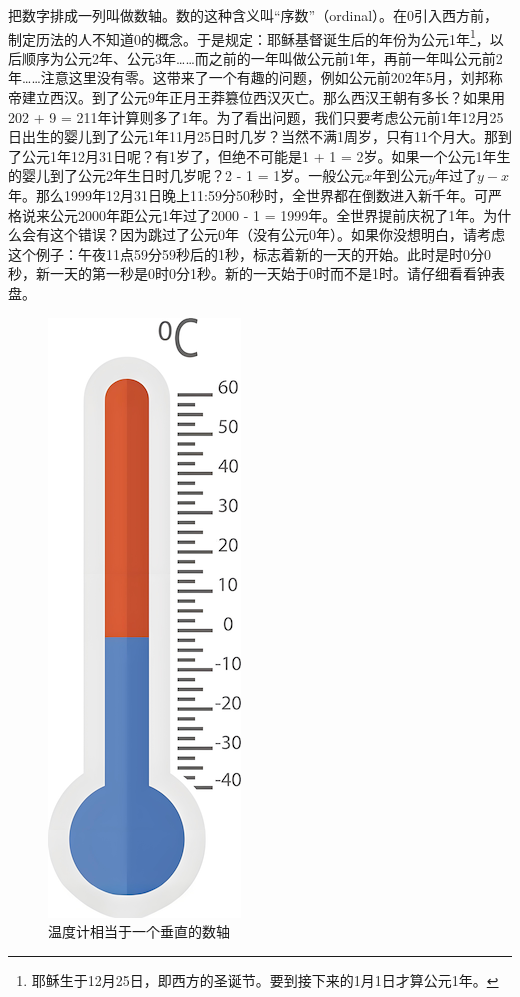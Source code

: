 \documentclass[b5paper]{ctexart}
\begin{document}
  
把数字排成一列叫做数轴。数的这种含义叫“序数”（ordinal）。在0引入西方前，制定历法的人不知道0的概念。于是规定：耶稣基督诞生后的年份为公元1年\footnote{耶稣生于12月25日，即西方的圣诞节。要到接下来的1月1日才算公元1年。}，以后顺序为公元2年、公元3年……而之前的一年叫做公元前1年，再前一年叫公元前2年……注意这里没有零。这带来了一个有趣的问题，例如公元前202年5月，刘邦称帝建立西汉。到了公元9年正月王莽篡位西汉灭亡。那么西汉王朝有多长？如果用202 + 9 = 211年计算则多了1年。为了看出问题，我们只要考虑公元前1年12月25日出生的婴儿到了公元1年11月25日时几岁？当然不满1周岁，只有11个月大。那到了公元1年12月31日呢？有1岁了，但绝不可能是1 + 1 = 2岁。如果一个公元1年生的婴儿到了公元2年生日时几岁呢？2 - 1 = 1岁。一般公元$x$年到公元$y$年过了$y - x$年。那么1999年12月31日晚上11:59分50秒时，全世界都在倒数进入新千年。可严格说来公元2000年距公元1年过了2000 - 1 = 1999年。全世界提前庆祝了1年。为什么会有这个错误？因为跳过了公元0年（没有公元0年）。如果你没想明白，请考虑这个例子：午夜11点59分59秒后的1秒，标志着新的一天的开始。此时是时0分0秒，新一天的第一秒是0时0分1秒。新的一天始于0时而不是1时。请仔细看看钟表盘。

\begin{figure}[htbp]
 \centering
 \includegraphics[scale=0.35]{img/thermometer}
 \caption{温度计相当于一个垂直的数轴}
 \label{fig:thermometer}
\end{figure}
\end{document}
